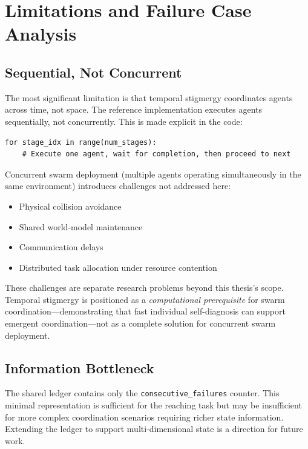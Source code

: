 \documentclass[12pt,a4paper,oneside]{report}
\begin{document}
\section{Limitations and Failure Case Analysis}

\subsection{Sequential, Not Concurrent}
\label{subsec:sequential_not_concurrent}

The most significant limitation is that temporal stigmergy coordinates agents across time, not space. The reference implementation executes agents sequentially, not concurrently. This is made explicit in the code:

\begin{verbatim}
for stage_idx in range(num_stages):
    # Execute one agent, wait for completion, then proceed to next
\end{verbatim}

Concurrent swarm deployment (multiple agents operating simultaneously in the same environment) introduces challenges not addressed here:
\begin{itemize}
    \item Physical collision avoidance
    \item Shared world-model maintenance
    \item Communication delays
    \item Distributed task allocation under resource contention
\end{itemize}

These challenges are separate research problems beyond this thesis's scope. Temporal stigmergy is positioned as a \textit{computational prerequisite} for swarm coordination—demonstrating that fast individual self-diagnosis can support emergent coordination—not as a complete solution for concurrent swarm deployment.

\subsection{Information Bottleneck}
\label{subsec:information_bottleneck}

The shared ledger contains only the \texttt{consecutive\_failures} counter. This minimal representation is sufficient for the reaching task but may be insufficient for more complex coordination scenarios requiring richer state information. Extending the ledger to support multi-dimensional state is a direction for future work.
\end{document}
